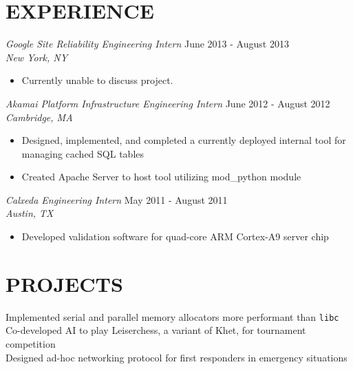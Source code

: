 \documentclass[margin]{res}
\begin{document}
\begin{resume}
\section{EXPERIENCE} 
                    {\sl Google Site Reliability Engineering Intern} 
                    \hfill June 2013 -  August 2013 \\
                    {\sl  New York, NY}
                    \begin{itemize}  \itemsep -2pt %
                         \item  Currently unable to discuss project.
                    \end{itemize}

                    {\sl Akamai Platform Infrastructure Engineering Intern} 
                    \hfill June 2012 -  August 2012 \\
                    {\sl Cambridge, MA}
                    \begin{itemize}  \itemsep -2pt %
                         \item  Designed, implemented, and completed a 
                           currently deployed internal tool for managing cached 
                           SQL tables
                         \item Created Apache Server to host tool utilizing 
                           mod\_python module 
                    \end{itemize}

                    {\sl Calxeda Engineering Intern} 
                    \hfill May 2011 - August 2011 \\
                    {\sl Austin, TX}
                    \begin{itemize}  \itemsep -2pt %
                          \item Developed validation software for quad-core ARM 
                            Cortex-A9 server chip
                    \end{itemize}

\section{PROJECTS}  Implemented serial and parallel memory allocators more
                      performant than \texttt{libc} \\
                    Co-developed AI to play Leiserchess, a variant of Khet, for 
                      tournament competition \\
                    Designed ad-hoc networking protocol for first responders in
                      emergency situations
 

\end{resume}
\end{document}
